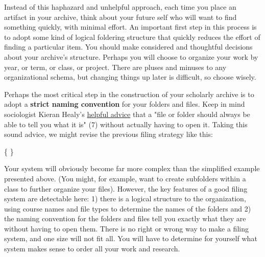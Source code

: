 Instead of this haphazard and unhelpful approach, each time you place an artifact in your archive, think about your future self who will want to find something quickly, with minimal effort. An important first step in this process is to adopt some kind of logical foldering structure that quickly reduces the effort of finding a particular item. You should make considered and thoughtful decisions about your archive's structure. Perhaps you will choose to organize your work by year, or term, or class, or project. There are pluses and minuses to any organizational schema, but changing things up later is difficult, so choose wisely. 

Perhaps the most critical step in the construction of your scholarly archive is to adopt a \textbf{strict naming convention} for your folders and files. Keep in mind sociologist Kieran Healy's \href{https://kieranhealy.org/files/papers/plain-person-text.pdf}{helpful advice} that a "file or folder should always be able to tell you what it is" (7) without actually having to open it. Taking this sound advice, we might revise the previous filing strategy like this:

\medskip

{\large
{}
}

\begin{center} \{  \} \end{center}

Your system will obviously become far more complex than the simplified example presented above. (You might, for example, want to create subfolders within a class to further organize your files). However, the key features of a good filing system are detectable here: 1) there is a logical structure to the organization, using course names and file types to determine the names of the folders and 2) the naming convention for the folders and files tell you exactly what they are without having to open them. There is no right or wrong way to make a filing system, and one size will not fit all. You will have to determine for yourself what system makes sense to order all your work and research. 

